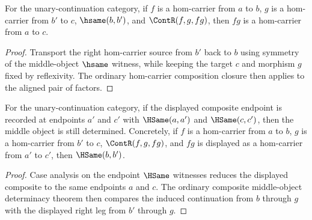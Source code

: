 \begin{theorem}
\label{thm:category-hom-carrier-comp-middle-hsame-closed}
For the unary-continuation category, if \(f\) is a hom-carrier from \(a\) to
\(b\), \(g\) is a hom-carrier from \(b'\) to \(c\),
\(\hsame(b,b')\), and \(\ContR(f,g,fg)\), then \(fg\) is a hom-carrier from
\(a\) to \(c\).
\end{theorem}
\begin{proof}
Transport the right hom-carrier source from \(b'\) back to \(b\) using
symmetry of the middle-object \(\hsame\) witness, while keeping the target
\(c\) and morphism \(g\) fixed by reflexivity. The ordinary hom-carrier
composition closure then applies to the aligned pair of factors.
\end{proof}

\begin{theorem}
\label{thm:category-hom-carrier-comp-middle-object-endpoint-hsame-deterministic}
For the unary-continuation category, if the displayed composite endpoint is
recorded at endpoints $a'$ and $c'$ with $\HSame(a,a')$ and $\HSame(c,c')$,
then the middle object is still determined. Concretely, if $f$ is a
hom-carrier from $a$ to $b$, $g$ is a hom-carrier from $b'$ to $c$,
$\ContR(f,g,fg)$, and $fg$ is displayed as a hom-carrier from $a'$ to $c'$,
then $\HSame(b,b')$.
\end{theorem}
\begin{proof}
Case analysis on the endpoint $\HSame$ witnesses reduces the displayed
composite to the same endpoints $a$ and $c$. The ordinary composite
middle-object determinacy theorem then compares the induced continuation from
$b$ through $g$ with the displayed right leg from $b'$ through $g$.
\end{proof}

